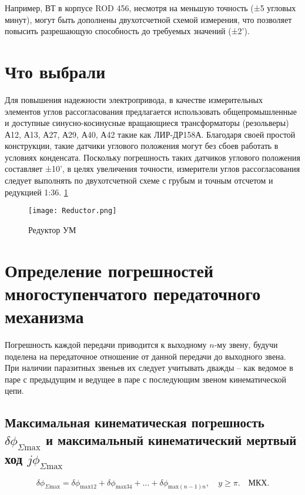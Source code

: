 Например, ВТ в корпусе ROD 456, несмотря на меньшую точность (±5 угловых минут), могут быть дополнены двухотсчетной схемой измерения, 
что позволяет повысить разрешающую способность до требуемых значений (±2’).


\section{Что выбрали}

Для повышения надежности электропривода, в качестве измерительных элементов углов рассогласования предлагается использовать общепромышленные и доступные 
синусно-косинусные вращающиеся трансформаторы (резольверы) А12, А13, А27, А29, А40, А42 такие как ЛИР-ДР158А. Благодаря своей простой конструкции, 
такие датчики углового положения могут без сбоев работать в условиях конденсата. Поскольку погрешность таких датчиков углового положения составляет ±10', 
в целях увеличения точности, измерители углов рассогласования следует выполнять по двухотсчетной схеме с грубым и точным отсчетом и редукцией 1:36. \ref{Reductor} 

  \begin{figure}[!t]
    \centering
    \texttt{[image: Reductor.png]}
    \caption{Редуктор УМ}
    \label{Reductor}
  \end{figure}

\section*{Определение погрешностей многоступенчатого передаточного механизма}

Погрешность каждой передачи приводится к выходному $n$-му звену, будучи поделена на передаточное отношение от данной передачи до выходного звена. При наличии паразитных звеньев их следует учитывать дважды -- как ведомое в паре с предыдущим и ведущее в паре с последующим звеном кинематической цепи.

\subsection*{Максимальная кинематическая погрешность $\delta\phi_{\Sigma \text{max}}$ и максимальный кинематический мертвый ход $j\phi_{\Sigma \text{max}}$}

\begin{equation}
    \delta\phi_{\Sigma \text{max}} = \delta\phi_{\text{max}12} + \delta\phi_{\text{max}34} + \dots + \delta\phi_{\text{max}(n-1)n}, \quad y \geq \pi. \quad \text{МКХ.} \tag{6.53}
\end{equation}

